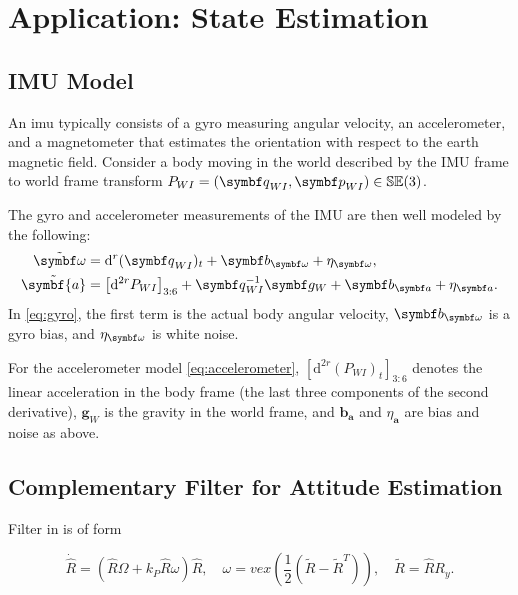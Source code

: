 
\chapter{Application: State Estimation}

\section{IMU Model}

An imu typically consists of a gyro measuring angular velocity, an accelerometer, and a magnetometer that estimates the orientation with respect to the earth magnetic field. Consider a body moving in the world described by the IMU frame to world frame transform $P_{WI} = (\bq_{WI}, \bp_{WI}) \in \mathbb{SE}(3)$.

The gyro and accelerometer measurements of the IMU are then well modeled by the following:
\begin{subequations}
  \begin{align}
    \label{eq:gyro}  \tilde \bomega              & = \mathrm{d}^r (\bq_{WI})_t + \symbf b_\bomega + \eta_\bomega,                                                     \\
    \label{eq:accelerometer} \tilde {\symbf {a}} & = \left[ \mathrm{d}^{2r} P_{WI} \right]_{3:6} + \bq_{WI}^{-1} \symbf g_W + \symbf b_{\symbf a} + \eta_{\symbf a}.
  \end{align}
\end{subequations}
In \eqref{eq:gyro}, the first term is the actual body angular velocity, $\symbf b_\bomega$ is a gyro bias, and $\eta_\bomega$ is white noise.

For the accelerometer model \eqref{eq:accelerometer}, $\left[ \mathrm{d}^{2r} (P_{WI})_t \right]_{3:6}$ denotes the linear acceleration in the body frame (the last three components of the second derivative), $\symbf g_W$ is the gravity in the world frame, and $\symbf b_{\symbf a}$ and $\eta_{\symbf a}$ are bias and noise as above.


\section{Complementary Filter for Attitude Estimation}

Filter in \cite{mahony_nonlinear_2008} is of form

$$
  \dot {\hat R} = (\hat R \Omega + k_P \hat R \omega) \hat R, \quad \omega = vex \left( \frac{1}{2} \left( \tilde R - \tilde R^T \right) \right), \quad \tilde R = \hat R R_y.
$$

